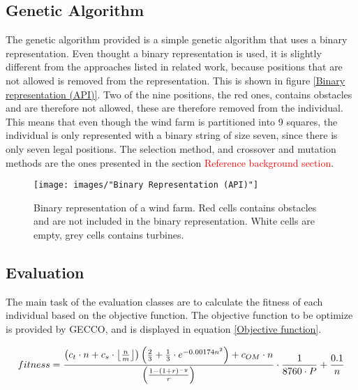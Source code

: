 \subsection{Genetic Algorithm}
The genetic algorithm provided is a simple genetic algorithm that uses a binary representation. Even thought a binary representation is used, it is slightly different from the approaches listed in related work, because positions that are not allowed is removed from the representation. This is shown in figure \ref{Binary representation (API)}. Two of the nine positions, the red ones, contains obstacles and are therefore not allowed, these are therefore removed from the individual. This means that even though the wind farm is partitioned into 9 squares, the individual is only represented with a binary string of size seven, since there is only seven legal positions. The selection method, and crossover and mutation methods are the ones presented in the section \textcolor{red}{Reference background section}.


\begin{figure}[h!]
\begin{center}
\texttt{[image: images/"Binary Representation (API)"]}
\caption{Binary representation of a wind farm. Red cells contains obstacles and are not included in the binary representation. White cells are empty, grey cells contains turbines.}
\label{Binary Representation (API)}
\end{center}
\end{figure}


\subsection{Evaluation}


The main task of the evaluation classes are to calculate the fitness of each individual based on the objective function.  The objective function to be optimize is provided by GECCO, and is displayed in equation \ref{Objective function}.\\

\begin{small}
\begin{equation}
fitness =  \frac{ \left( c_t \cdot n + c_s \cdot \floor*{\frac{n}{m}} \right) \left( \frac{2}{3} + \frac{1}{3} \cdot e^{-0.00174n^2} \right) + c_{OM} \cdot n}{\left( \frac{1 - (1 + r)^{-y}}{r} \right) } \cdot \frac{1}{8760 \cdot P} + \frac{0.1}{n}
\label{Objective function} 
\end{equation}
\end{small}


